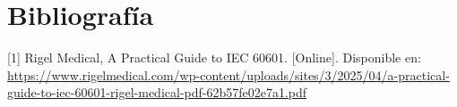 \section{Bibliografía}

[1] Rigel Medical, A Practical Guide to IEC 60601. [Online]. 
Disponible en: 
\url{https://www.rigelmedical.com/wp-content/uploads/sites/3/2025/04/a-practical-guide-to-iec-60601-rigel-medical-pdf-62b57fe02e7a1.pdf}